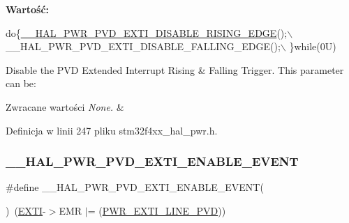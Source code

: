 {\bfseries Wartość\+:}
\begin{DoxyCode}
\textcolor{keywordflow}{do}\{\hyperlink{group___p_w_r___exported___macro_ga1ca8fd7f3286a176f6be540c75a004c6}{\_\_HAL\_PWR\_PVD\_EXTI\_DISABLE\_RISING\_EDGE}();\(\backslash\)
                                                             \_\_HAL\_PWR\_PVD\_EXTI\_DISABLE\_FALLING\_EDGE();\(\backslash\)
                                                            \}\textcolor{keywordflow}{while}(0U)
\end{DoxyCode}


Disable the P\+VD Extended Interrupt Rising \& Falling Trigger. This parameter can be\+: 


\begin{DoxyRetVals}{Zwracane wartości}
{\em None.} & \\
\hline
\end{DoxyRetVals}


Definicja w linii 247 pliku stm32f4xx\+\_\+hal\+\_\+pwr.\+h.

\mbox{\label{group___p_w_r___exported___macro_gae5ba5672fe8cb7c1686c7f2cc211b128}} 
\subsubsection{\texorpdfstring{\+\_\+\+\_\+\+H\+A\+L\+\_\+\+P\+W\+R\+\_\+\+P\+V\+D\+\_\+\+E\+X\+T\+I\+\_\+\+E\+N\+A\+B\+L\+E\+\_\+\+E\+V\+E\+NT}{\_\_HAL\_PWR\_PVD\_EXTI\_ENABLE\_EVENT}}
{\footnotesize\ttfamily \#define \+\_\+\+\_\+\+H\+A\+L\+\_\+\+P\+W\+R\+\_\+\+P\+V\+D\+\_\+\+E\+X\+T\+I\+\_\+\+E\+N\+A\+B\+L\+E\+\_\+\+E\+V\+E\+NT(\begin{DoxyParamCaption}{ }\end{DoxyParamCaption})~(\hyperlink{group___peripheral__declaration_ga9189e770cd9b63dadd36683eb9843cac}{E\+X\+TI}-\/$>$E\+MR $\vert$= (\hyperlink{group___p_w_r___p_v_d___e_x_t_i___line_ga43a49255649e03d2d2b6b12c5c379d2b}{P\+W\+R\+\_\+\+E\+X\+T\+I\+\_\+\+L\+I\+N\+E\+\_\+\+P\+VD}))}



